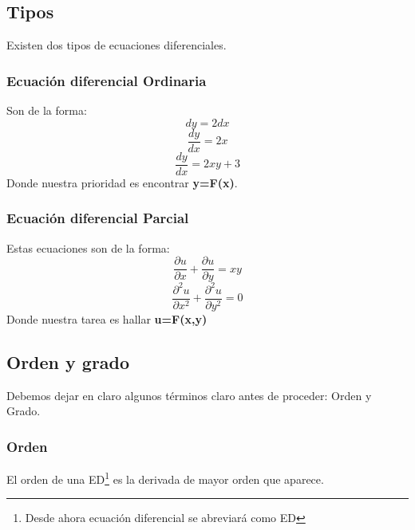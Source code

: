 \documentclass[
	12pt, %
	fleqn, %
	a4paper, %
]{LegrandOrangeBook}
\begin{document}
\subsection{Tipos}
Existen dos tipos de ecuaciones diferenciales.
\subsubsection{Ecuación diferencial Ordinaria}
Son de la forma:
\begin{displaymath}
dy=2dx
\end{displaymath}
\begin{displaymath}
\frac{dy}{dx}=2x
\end{displaymath}
\begin{displaymath}
\frac{dy}{dx}=2xy+3
\end{displaymath}
Donde nuestra prioridad es encontrar \textbf{y=F(x)}.
\subsubsection{Ecuación diferencial Parcial}
Estas ecuaciones son de la forma:
\begin{displaymath}
\frac{\partial u}{\partial x}+\frac{\partial u}{\partial y}=xy
\end{displaymath}
\begin{displaymath}
\frac{\partial ^2u}{\partial x^2}+\frac{\partial ^2u}{\partial y^2}=0
\end{displaymath}
Donde nuestra tarea es hallar \textbf{u=F(x,y)}
\subsection{Orden y grado}
Debemos dejar en claro algunos términos claro antes de proceder: Orden y Grado.
\subsubsection{Orden}
El orden de una ED\footnote{Desde ahora ecuación diferencial se abreviará como ED} es la derivada de mayor orden que aparece.
\end{document}
